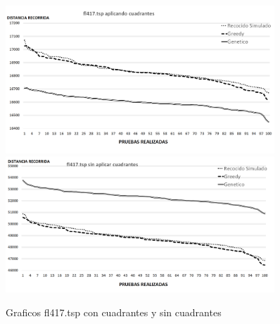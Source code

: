  \begin{figure}[hbtp]
    \centering
        \includegraphics[width=0.9\textwidth]{PruebasResultados/Experimentos_Graficos_Con/fl417.png}
        \includegraphics[width=0.9\textwidth]{PruebasResultados/Experimentos_Graficos_Sin/fl417.png}
        \caption{Graficos fl417.tsp con cuadrantes y sin cuadrantes}
        \label{fig:fl417_grafica.png}
\end{figure}
\newpage

